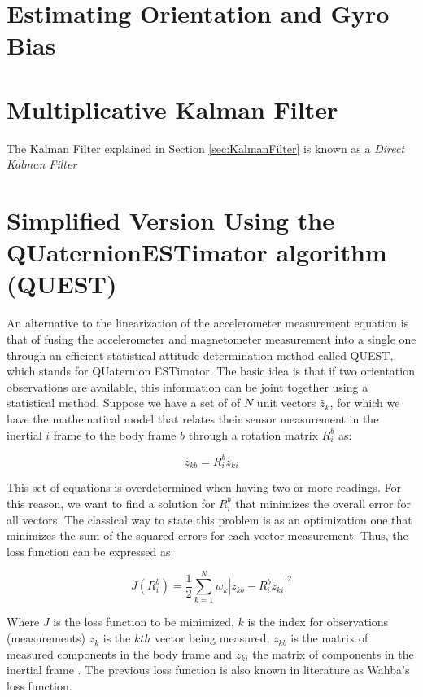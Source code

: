 \documentclass[a4paper,10pt]{article}
\begin{document}
 \newpage

\section{Estimating Orientation and Gyro Bias}

\section{Multiplicative Kalman Filter}
The Kalman Filter explained in Section \ref{sec:KalmanFilter} is known as a \emph{Direct Kalman Filter} 


\section{Simplified Version Using the QUaternionESTimator algorithm (QUEST)}
\label{sect:questSection}
An alternative to the linearization of the accelerometer measurement equation is that of fusing the accelerometer and magnetometer measurement into a single one through an efficient statistical attitude determination method called QUEST, which stands for QUaternion ESTimator. The basic idea is that if two orientation observations are available, this information can be joint together using a statistical method. Suppose we have a set of of $N$ unit vectors $\hat{z}_k$, for which we have the mathematical model	 that relates their sensor measurement in the inertial ${i}$ frame to the body frame ${b}$ through a rotation matrix $R^b_i$ as:

\begin{equation}
 z_{kb} = R^b_i z_{ki}
\end{equation}

This set of equations is overdetermined when having two or more readings. For this reason, we want to find a solution for $R^b_i$ that minimizes the overall error for all vectors. The classical way to state this problem is as an optimization one that minimizes the sum of the squared errors for each vector measurement. Thus, the loss function can be expressed as:

\begin{equation}
 J(R^b_i) = \frac{1}{2}  \sum^{N}_{k=1}  w_k \left| z_{kb} - R^b_i z_{ki} \right|^2 
\end{equation}

Where $J$ is the loss function to be minimized, $k$ is the index for observations (measurements) $z_{k}$ is the $kth$ vector being measured, $z_{kb}$ is the matrix of measured components in the body frame and $z_{ki}$ the matrix of components in the inertial frame \cite{HallNotes2003}. The previous loss function is also known in literature as Wahba's loss function. 
\end{document}
